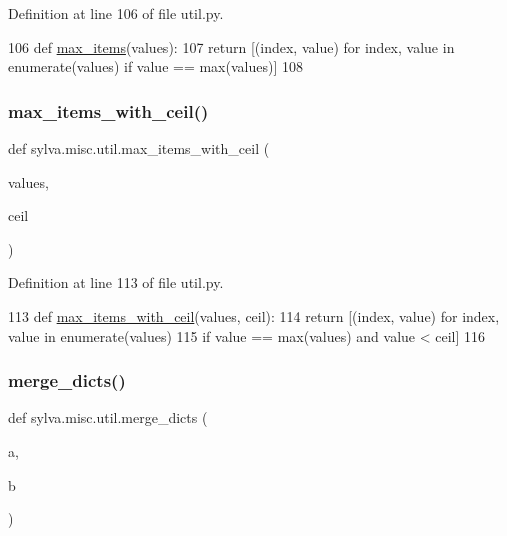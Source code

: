 Definition at line 106 of file util.\+py.


\begin{DoxyCode}
106 \textcolor{keyword}{def }\hyperlink{namespacesylva_1_1misc_1_1util_ab250130a1258b854bd002c06c3467f57}{max\_items}(values):
107     \textcolor{keywordflow}{return} [(index, value) \textcolor{keywordflow}{for} index, value \textcolor{keywordflow}{in} enumerate(values) \textcolor{keywordflow}{if} value == max(values)]
108 
\end{DoxyCode}
\mbox{\label{namespacesylva_1_1misc_1_1util_aea54b6ab8ee247ea3d042b09b5333c1c}} 
\subsubsection{\texorpdfstring{max\+\_\+items\+\_\+with\+\_\+ceil()}{max\_items\_with\_ceil()}}
{\footnotesize\ttfamily def sylva.\+misc.\+util.\+max\+\_\+items\+\_\+with\+\_\+ceil (\begin{DoxyParamCaption}\item[{}]{values,  }\item[{}]{ceil }\end{DoxyParamCaption})}



Definition at line 113 of file util.\+py.


\begin{DoxyCode}
113 \textcolor{keyword}{def }\hyperlink{namespacesylva_1_1misc_1_1util_aea54b6ab8ee247ea3d042b09b5333c1c}{max\_items\_with\_ceil}(values, ceil):
114     \textcolor{keywordflow}{return} [(index, value) \textcolor{keywordflow}{for} index, value \textcolor{keywordflow}{in} enumerate(values)
115             \textcolor{keywordflow}{if} value == max(values) \textcolor{keywordflow}{and} value < ceil]
116 
\end{DoxyCode}
\mbox{\label{namespacesylva_1_1misc_1_1util_a5cd57a1d193048a940df5f3795423f8c}} 
\subsubsection{\texorpdfstring{merge\+\_\+dicts()}{merge\_dicts()}}
{\footnotesize\ttfamily def sylva.\+misc.\+util.\+merge\+\_\+dicts (\begin{DoxyParamCaption}\item[{}]{a,  }\item[{}]{b }\end{DoxyParamCaption})}



